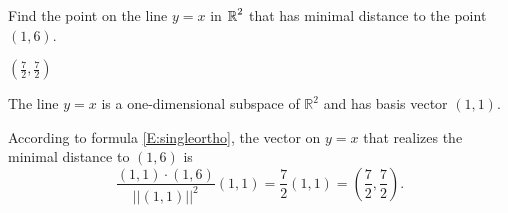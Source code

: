 \documentclass{ximera}
\begin{document}
\begin{exercise} \label{YZ_9.1.2}
Find the point on the line $y=x$ in $\mbox{$\mathbb{R}$}^2$ that has minimal distance to the point $(1,6)$.
\begin{solution}

\ans $(\frac{7}{2},\frac{7}{2})$

\soln The line $y=x$ is a one-dimensional subspace of $\mathbb R^2$ and has basis vector $(1,1)$.

According to formula \eqref{E:singleortho}, the vector on $y = x$ that realizes the minimal distance to $(1,6)$ is 
\[
\frac{(1,1)\cdot (1,6)}{||(1,1)||^2}(1,1) = \frac{7}{2}(1,1) = (\frac{7}{2},\frac{7}{2}).
\]
\end{solution}
\end{exercise}
\end{document}
